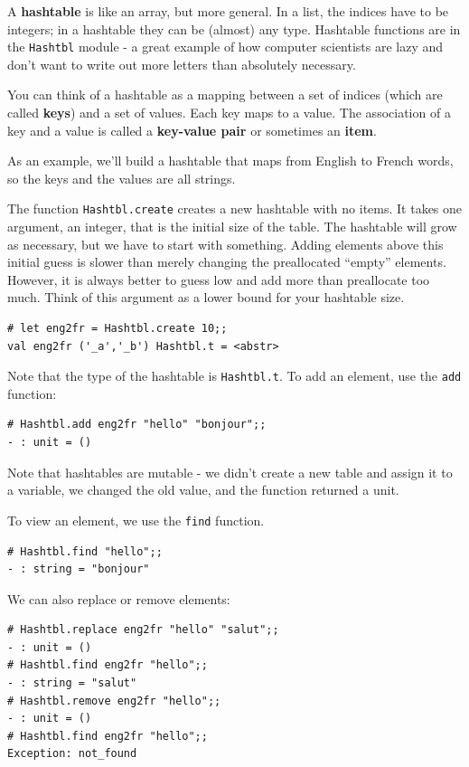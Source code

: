 \documentclass[10pt]{book}
\begin{document}
{A {\bf hashtable} is like an array, but more general.  In a list,
the indices have to be integers; in a hashtable they can
be (almost) any type. Hashtable functions are in the {\tt Hashtbl} 
module - a great example of how computer scientists are lazy and don't 
want to write out more letters than absolutely necessary.

You can think of a hashtable as a mapping between a set of indices
(which are called {\bf keys}) and a set of values.  Each key maps to a
value.  The association of a key and a value is called a {\bf
  key-value pair} or sometimes an {\bf item}.

As an example, we'll build a hashtable that maps from English
to French words, so the keys and the values are all strings.

The function {\tt Hashtbl.create} creates a new hashtable with no items.
It takes one argument, an integer, that is the initial size of the table.
The hashtable will grow as necessary, but we have to start with something.
Adding elements above this initial guess is slower than merely
changing the preallocated ``empty'' elements. However, it is always better
to guess low and add more than preallocate too much. Think of this argument 
as a lower bound for your hashtable size.

\beforeverb
\begin{verbatim}
# let eng2fr = Hashtbl.create 10;;
val eng2fr ('_a','_b') Hashtbl.t = <abstr>
\end{verbatim}
\afterverb

Note that the type of the hashtable is {\tt Hashtbl.t}. To add an element, use the 
{\tt add} function:

\beforeverb
\begin{verbatim}
# Hashtbl.add eng2fr "hello" "bonjour";;
- : unit = ()
\end{verbatim}
\afterverb

Note that hashtables are mutable - we didn't create a new table and assign it to 
a variable, we changed the old value, and the function returned a unit.

To view an element, we use the {\tt find} function.

\beforeverb
\begin{verbatim}
# Hashtbl.find "hello";;
- : string = "bonjour"
\end{verbatim}
\afterverb

We can also replace or remove elements:

\beforeverb
\begin{verbatim}
# Hashtbl.replace eng2fr "hello" "salut";;
- : unit = ()
# Hashtbl.find eng2fr "hello";;
- : string = "salut"
# Hashtbl.remove eng2fr "hello";;
- : unit = ()
# Hashtbl.find eng2fr "hello";;
Exception: not_found
\end{verbatim}
\afterverb

}
\end{document}
